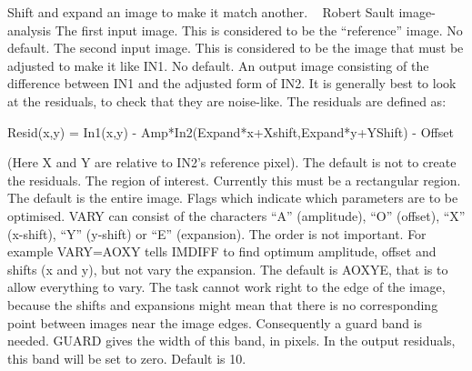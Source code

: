 %
\noindent Shift and expand an image to make it match another.
\newline \ 
\newline {} Robert Sault
\newline {} image-analysis
The first input image. This is considered to be the ``reference''
image. No default.
The second input image. This is considered to be the image that must be
adjusted to make it like IN1. No default.
An output image consisting of the difference between IN1 and the
adjusted form of IN2. It is generally best to look at the residuals,
to check that they are noise-like. The residuals are defined as:
{\eightpoint\begintt
  
Resid(x,y) = In1(x,y) - Amp*In2(Expand*x+Xshift,Expand*y+YShift) - Offset
  
\endtt}
(Here X and Y are relative to IN2's reference pixel). The default is
not to create the residuals.
The region of interest. Currently this must be a rectangular
region. The default is the entire image.
Flags which indicate which parameters are to be optimised. VARY can
consist of the characters ``A'' (amplitude), ``O'' (offset), ``X''
(x-shift), ``Y'' (y-shift) or ``E'' (expansion). The order is not
important. For example VARY=AOXY tells IMDIFF to find optimum
amplitude, offset and shifts (x and y), but not vary the expansion.
The default is AOXYE, that is to allow everything to vary. 
The task cannot work right to the edge of the image, because the
shifts and expansions might mean that there is no corresponding point
between images near the image edges. Consequently a guard band is
needed. GUARD gives the width of this band, in pixels. In the output
residuals, this band will be set to zero. Default is 10. 

